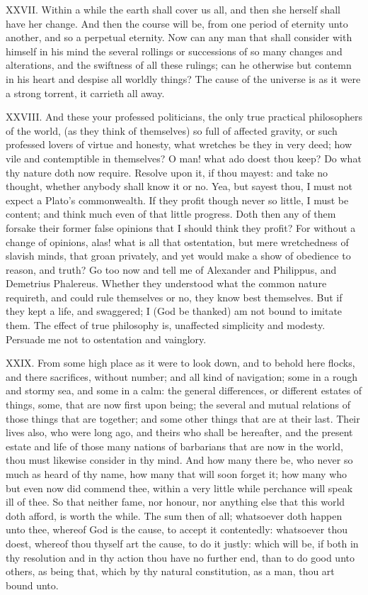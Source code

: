 XXVII. Within a while the earth shall cover us all, and then she herself
shall have her change. And then the course will be, from one period of
eternity unto another, and so a perpetual eternity. Now can any man that
shall consider with himself in his mind the several rollings or
successions of so many changes and alterations, and the swiftness of all
these rulings; can he otherwise but contemn in his heart and despise all
worldly things? The cause of the universe is as it were a strong torrent,
it carrieth all away.

XXVIII. And these your professed politicians, the only true practical
philosophers of the world, (as they think of themselves) so full of
affected gravity, or such professed lovers of virtue and honesty, what
wretches be they in very deed; how vile and contemptible in themselves? O
man! what ado doest thou keep? Do what thy nature doth now require.
Resolve upon it, if thou mayest: and take no thought, whether anybody
shall know it or no. Yea, but sayest thou, I must not expect a Plato's
commonwealth. If they profit though never so little, I must be content;
and think much even of that little progress. Doth then any of them forsake
their former false opinions that I should think they profit? For without a
change of opinions, alas! what is all that ostentation, but mere
wretchedness of slavish minds, that groan privately, and yet would make a
show of obedience to reason, and truth? Go too now and tell me of
Alexander and Philippus, and Demetrius Phalereus. Whether they understood
what the common nature requireth, and could rule themselves or no, they
know best themselves. But if they kept a life, and swaggered; I (God be
thanked) am not bound to imitate them. The effect of true philosophy is,
unaffected simplicity and modesty. Persuade me not to ostentation and
vainglory.

XXIX. From some high place as it were to look down, and to behold
here flocks, and there sacrifices, without number; and all kind of
navigation; some in a rough and stormy sea, and some in a calm: the
general differences, or different estates of things, some, that are now
first upon being; the several and mutual relations of those things that
are together; and some other things that are at their last. Their lives
also, who were long ago, and theirs who shall be hereafter, and the
present estate and life of those many nations of barbarians that are now
in the world, thou must likewise consider in thy mind. And how many there
be, who never so much as heard of thy name, how many that will soon forget
it; how many who but even now did commend thee, within a very little while
perchance will speak ill of thee. So that neither fame, nor honour, nor
anything else that this world doth afford, is worth the while. The sum
then of all; whatsoever doth happen unto thee, whereof God is the cause,
to accept it contentedly: whatsoever thou doest, whereof thou thyself art
the cause, to do it justly: which will be, if both in thy resolution and
in thy action thou have no further end, than to do good unto others, as
being that, which by thy natural constitution, as a man, thou art bound
unto.

